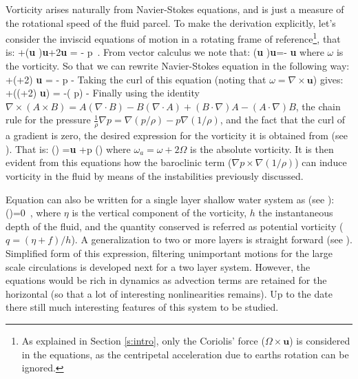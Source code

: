 Vorticity arises naturally from Navier-Stokes equations, and is just
a measure of the rotational speed of the fluid parcel. To make the
derivation explicitly, let's consider the inviscid equations of motion in
a rotating frame of reference\footnote{
    As explained in Section
    \ref{s:intro}, only the Coriolis' force ($\Omega \times \textbf{u}$) is
    considered in the equations, as the centripetal acceleration due to
    earths rotation can be ignored.
}, that is:
\beq
{}+(\textbf{u} \cdot \nabla)\textbf{u}+2\Omega \times \textbf{u}
= - \nabla p
\,.
From vector calculus we note that:
\beq
(\textbf{u} \cdot \nabla)\textbf{u}=- \textbf{u} \times \omega
{}
where $\omega$ is the vorticity. So that we can rewrite Navier-Stokes
equation in the following way:
\beq
{}+(\omega+2\Omega) \times \textbf{u} = - \nabla p -
Taking the curl of this equation (noting that $\omega = \nabla \times
\textbf{u}$) gives:
\beq
{}+\nabla \times ((\omega+2\Omega) \times \textbf{u}) = -\nabla \times\left( \nabla p\right) -\nabla \times {}
Finally using the identity $\nabla \times (A \times B) = A (\nabla
\cdot B)-B (\nabla \cdot A)+(B \cdot \nabla)A-(A \cdot \nabla)B$, the
chain rule for the pressure $\frac{1}{\rho} \nabla p = \nabla (p/\rho)-p
\nabla (1/\rho)$, and the fact that the curl of a gradient is zero, the
desired expression for the vorticity it is obtained from
 (see ). That is:
\beq
{}\left(\right)
= \textbf{u}
  +\nabla p \times \nabla \left(\right)
where $\omega_a=\omega+2\Omega$ is the absolute vorticity. It is then
evident from this equations how the baroclinic term ($\nabla p \times
\nabla (1/\rho)$) can induce vorticity in the fluid by means of the
instabilities previously discussed.

Equation  can also be written for a single layer shallow water system as (see ):
\beq
{}\left(\right)=0
\,,
where $\eta$ is the vertical component of the vorticity, $h$ the instantaneous depth of the fluid, and the quantity conserved is referred as potential vorticity ($q=(\eta + f)/h$). A generalization to two or  more layers is straight forward (see ).  Simplified form of this
expression, filtering unimportant motions for the large scale circulations
is developed next for a two layer system. However, the equations would be rich in dynamics as advection terms are retained for the horizontal
(so that a lot of interesting nonlinearities remains). Up to the date
there still much interesting features of this system to be studied.




